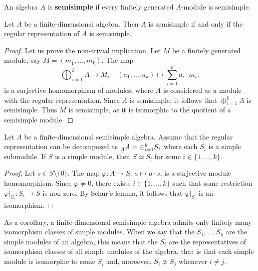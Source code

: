 \begin{definition}
    An algebra $A$ is \textbf{semisimple} if every finitely generated $A$-module is semisimple. 
\end{definition}

\begin{proposition}
Let $A$ be a finite-dimensional algebra. Then $A$ is semisimple if and only if 
the regular representation of $A$ is semisimple. 
\end{proposition}

\begin{proof}
Let us prove the non-trivial implication. Let $M$ be a finitely generated module, say $M=(m_1,\dots,m_k)$. 
The map
\[
\bigoplus_{i=1}^k A\to M,\quad
(a_1,\dots,a_k)\mapsto \sum_{i=1}^k a_i\cdot m_i,
\]
is a surjective homomorphism of modules, where $A$ is considered as a module with the regular
representation. Since 
$A$ is semisimple, it follows that $\oplus_{i=1}^kA$ is semisimple. 
Thus $M$ is semisimple, as it is isomorphic to the quotient of a semisimple module.
\end{proof}

\begin{theorem}
Let $A$ be a finite-dimensional semisimple algebra. 
Assume that the regular representation can be decomposed as $\prescript{}{A}A=\oplus_{i=1}^k S_i$ where each $S_i$ is a simple submodule.  
If $S$ is a simple module, then $S\simeq S_i$ for some $i\in\{1,\dots,k\}$. 
\end{theorem}

\begin{proof}
Let $s\in S\setminus\{0\}$. The map $\varphi\colon A\to S$, $a\mapsto a\cdot s$, is a surjective module homomorphism. Since 
$\varphi\ne 0$, there exists $i\in\{1,\dots,k\}$ such that some restriction 
$\varphi|_{S_i}\colon S_i\to S$ is non-zero. By Schur's lemma, it follows that  
$\varphi|_{S_i}$ is an isomorphism.   	
\end{proof}

As a corollary, a finite-dimensional semisimple algebra admits 
only finitely many isomorphism classes of simple modules. When we say that 
the $S_1,\dots,S_k$ are the simple modules of an algebra, this means that the $S_i$ are the representatives
of isomorphism classes of all simple modules of the algebra, that is that each simple module is isomorphic to
some $S_i$ and, moreover,  
$S_i\not\simeq S_j$ whenever $i\ne j$. 
